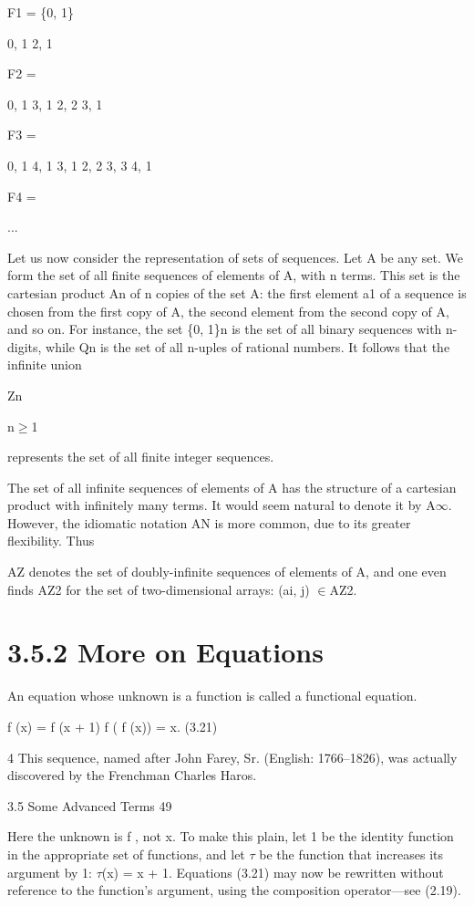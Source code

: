 \documentclass[11pt]{article}
\theoremstyle{plain}
\theoremstyle{definition}
\begin{document}
F1 = \{0, 1\}

0, 1 2, 1

F2 =

0, 1 3, 1 2, 2 3, 1

F3 =

0, 1 4, 1 3, 1 2, 2 3, 3 4, 1

F4 =

...

Let us now consider the representation of sets of sequences. Let A be any set. We form the set of all finite sequences of elements of A, with n terms. This set is the cartesian product An of n copies of the set A: the first element a1 of a sequence is chosen from the first copy of A, the second element from the second copy of A, and so on. For instance, the set \{0, 1\}n is the set of all binary sequences with n-digits, while Qn is the set of all n-uples of rational numbers. It follows that the infinite union

Zn

n$\geq$1

represents the set of all finite integer sequences.

The set of all infinite sequences of elements of A has the structure of a cartesian product with infinitely many terms. It would seem natural to denote it by A$\infty$. However, the idiomatic notation AN is more common, due to its greater flexibility. Thus

AZ denotes the set of doubly-infinite sequences of elements of A, and one even finds AZ2 for the set of two-dimensional arrays: (ai, j) $\in$AZ2.

\section{3.5.2 More on Equations}

An equation whose unknown is a function is called a functional equation.

f (x) = f (x + 1) f ( f (x)) = x. (3.21)

4 This sequence, named after John Farey, Sr. (English: 1766--1826), was actually discovered by the Frenchman Charles Haros.

3.5 Some Advanced Terms 49

Here the unknown is f , not x. To make this plain, let 1 be the identity function in the appropriate set of functions, and let $\tau$ be the function that increases its argument by 1: $\tau$(x) = x + 1. Equations (3.21) may now be rewritten without reference to the function's argument, using the composition operator---see (2.19).
\end{document}
